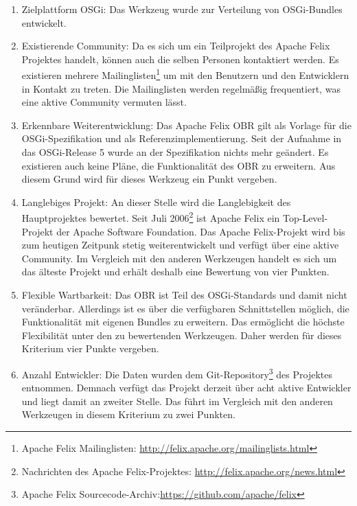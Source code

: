 \begin{enumerate}[label={Nr. \arabic*}, leftmargin=*, labelindent=1em]
 \item Zielplattform \ac{OSGi}: Das Werkzeug wurde zur Verteilung von \ac{OSGi}-Bundles entwickelt.
 
 \item Existierende Community:
 Da es sich um ein Teilprojekt des Apache Felix Projektes handelt, können auch die selben Personen kontaktiert werden.
 Es existieren mehrere Mailinglisten\footnote{Apache Felix Mailinglisten: \url{http://felix.apache.org/mailinglists.html}} um mit den Benutzern und den Entwicklern 
 in Kontakt zu treten. Die Mailinglisten werden regelmäßig frequentiert, was eine aktive Community vermuten lässt.
 
 \item Erkennbare Weiterentwicklung:
 Das Apache Felix \ac{OBR} gilt als Vorlage für die \ac{OSGi}-Spezifikation und als Referenzimplementierung.
 Seit der Aufnahme in das \ac{OSGi}-Release 5 wurde an der Spezifikation nichts mehr geändert. Es existieren auch keine Pläne, 
 die Funktionalität des \ac{OBR} zu erweitern.
 Aus diesem Grund wird für dieses Werkzeug ein Punkt vergeben.
 
 \item Langlebiges Projekt:
 An dieser Stelle wird die Langlebigkeit des Hauptprojektes bewertet.
 Seit Juli 2006\footnote{Nachrichten des Apache Felix-Projektes: \url{http://felix.apache.org/news.html}} ist Apache Felix ein Top-Level-Projekt der Apache Software Foundation. 
 Das Apache Felix-Projekt wird bis zum heutigen Zeitpunk stetig weiterentwickelt und verfügt über eine aktive Community.
 Im Vergleich mit den anderen Werkzeugen handelt es sich um das älteste Projekt und erhält deshalb eine Bewertung von vier Punkten.
 
 \item Flexible Wartbarkeit:
 Das \ac{OBR} ist Teil des \ac{OSGi}-Standards und damit nicht veränderbar. Allerdings ist es über die verfügbaren Schnittstellen möglich, 
 die Funktionalität mit eigenen Bundles zu erweitern.
 Das ermöglicht die höchste Flexibilität unter den zu bewertenden Werkzeugen. Daher werden für dieses Kriterium vier Punkte vergeben.
 
 \item Anzahl Entwickler:
 Die Daten wurden dem Git-Repository\footnote{Apache Felix Sourcecode-Archiv:\url{https://github.com/apache/felix}} des Projektes entnommen.
 Demnach verfügt das Projekt derzeit über acht aktive Entwickler und liegt damit an zweiter Stelle. 
 Das führt im Vergleich mit den anderen Werkzeugen in diesem Kriterium zu zwei Punkten.
 
 
\end{enumerate}

